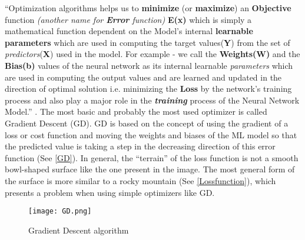 “Optimization algorithms helps us to \textbf{minimize} (or \textbf{maximize}) an \textbf{Objective} function
\textit{(another name for \textbf{Error} function)} \textbf{E(x)} which is simply a mathematical function dependent on the Model’s internal \textbf{learnable parameters}
which are used in computing the target values(\textbf{Y}) from the set of \textit{predictors}(\textbf{X}) used in the model. 
For example - we call the \textbf{Weights(W)} and the \textbf{Bias(b)} values of the neural network as its internal learnable \textit{parameters} 
which are used in computing the output values and are learned and updated in the direction of optimal solution i.e. 
minimizing the \textbf{Loss} by the network’s training process and also play a major role in the \textit{\textbf{training}} process of the Neural Network Model.” \cite{optimizaiton_algorithms}.
The most basic and probably the most used optimizer is called Gradient Descent (GD). 
GD is based on the concept of using the gradient of a loss or cost function and moving the weights and biases of the ML model so that the predicted value is taking a step in the decreasing direction of this error function 
(See \autoref{GD}). In general, the “terrain” of the loss function is not a smooth bowl-shaped surface like the one present in the image. The most general form of the surface is more similar to a rocky mountain (See \autoref{Lossfunction}), which presents a problem when using simple optimizers like GD.


\begin{figure}
\texttt{[image: GD.png]}
\caption{Gradient Descent algorithm}
\end{figure}




